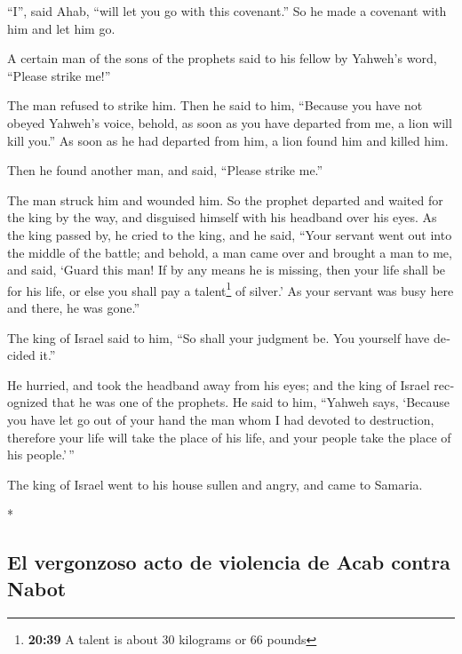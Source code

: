 \begin{paracol}{2}
\begin{otherlanguage}{english}
``I'', said Ahab, ``will let you go with this covenant.'' So he made a
covenant with him and let him go.

 A certain man of the sons of the prophets said to his
fellow by Yahweh's word, ``Please strike me!''

The man refused to strike him.  Then he said to him,
``Because you have not obeyed Yahweh's voice, behold, as soon as you
have departed from me, a lion will kill you.'' As soon as he had
departed from him, a lion found him and killed him.

 Then he found another man, and said, ``Please strike
me.''

The man struck him and wounded him.  So the prophet
departed and waited for the king by the way, and disguised himself with
his headband over his eyes.  As the king passed by, he
cried to the king, and he said, ``Your servant went out into the middle
of the battle; and behold, a man came over and brought a man to me, and
said, `Guard this man! If by any means he is missing, then your life
shall be for his life, or else you shall pay a talent\footnote{\textbf{20:39}
  A talent is about 30 kilograms or 66 pounds} of silver.'
 As your servant was busy here and there, he was gone.''

The king of Israel said to him, ``So shall your judgment be. You
yourself have decided it.''

 He hurried, and took the headband away from his eyes;
and the king of Israel recognized that he was one of the prophets.
 He said to him, ``Yahweh says, `Because you have let go
out of your hand the man whom I had devoted to destruction, therefore
your life will take the place of his life, and your people take the
place of his people.'\,''

 The king of Israel went to his house sullen and angry,
and came to Samaria.

\end{otherlanguage}

\switchcolumn[0]*

\hypertarget{el-vergonzoso-acto-de-violencia-de-acab-contra-nabot}{%
\subsection{El vergonzoso acto de violencia de Acab contra
Nabot}\label{el-vergonzoso-acto-de-violencia-de-acab-contra-nabot}}


\end{paracol}
